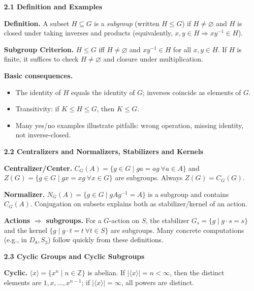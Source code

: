 \documentclass[12pt]{article}
\theoremstyle{definition}
\begin{document}
\textbf{2.1 Definition and Examples}

\newpage

\medskip
\textbf{Definition.} A subset $H\subseteq G$ is a \emph{subgroup} (written $H\le G$) if $H\neq\varnothing$ and $H$ is closed under taking inverses and products (equivalently, $x,y\in H\Rightarrow xy^{-1}\in H$).

\medskip
\textbf{Subgroup Criterion.} $H\le G$ iff $H\neq\varnothing$ and $xy^{-1}\in H$ for all $x,y\in H$. If $H$ is finite, it suffices to check $H\neq\varnothing$ and closure under multiplication.

\medskip
\textbf{Basic consequences.}
\begin{itemize}\itemsep3pt
\item The identity of $H$ equals the identity of $G$; inverses coincide as elements of $G$.
\item Transitivity: if $K\le H\le G$, then $K\le G$.
\item Many yes/no examples illustrate pitfalls: wrong operation, missing identity, not inverse-closed.
\end{itemize}

\newpage

\textbf{2.2 Centralizers and Normalizers, Stabilizers and Kernels}

\newpage

\medskip
\textbf{Centralizer/Center.} $C_G(A)=\{g\in G\mid ga=ag\ \forall a\in A\}$ and $Z(G)=\{g\in G\mid gx=xg\ \forall x\in G\}$ are subgroups. Always $Z(G)=C_G(G)$.

\medskip
\textbf{Normalizer.} $N_G(A)=\{g\in G\mid gAg^{-1}=A\}$ is a subgroup and contains $C_G(A)$. Conjugation on subsets explains both as stabilizer/kernel of an action.

\medskip
\textbf{Actions $\Rightarrow$ subgroups.} For a $G$-action on $S$, the stabilizer $G_s=\{g\mid g\cdot s=s\}$ and the kernel $\{g\mid g\cdot t=t\ \forall t\in S\}$ are subgroups. Many concrete computations (e.g., in $D_8,S_3$) follow quickly from these definitions.

\newpage

\textbf{2.3 Cyclic Groups and Cyclic Subgroups}

\newpage

\medskip
\textbf{Cyclic.} $\langle x\rangle=\{x^n\mid n\in\mathbb Z\}$ is abelian. If $|\langle x\rangle|=n<\infty$, then the distinct elements are $1,x,\dots,x^{n-1}$; if $|\langle x\rangle|=\infty$, all powers are distinct.
\end{document}

